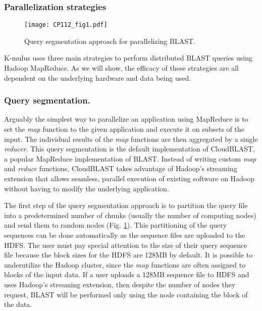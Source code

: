 \subsubsection{Parallelization strategies}

\begin{figure}[!htb]%
\begin{center}
\texttt{[image: CP112\_fig1.pdf]}
\end{center}
\renewcommand{\baselinestretch}{1}
\small\normalsize
\begin{quote}
\caption[Query segmentation approach for parallelizing BLAST]{Query segmentation approach for parallelizing BLAST.}
\label{fig:strategies}
\end{quote}
\end{figure}
\renewcommand{\baselinestretch}{2}
\small\normalsize


K-mulus uses three main strategies to perform distributed BLAST queries using Hadoop MapReduce.
As we will show, the efficacy of these strategies are all dependent on the underlying hardware and data being used.
\subsubsection{Query segmentation.}
Arguably the simplest way to parallelize an application using MapReduce is to set the \emph{map} function to the given application and execute it on subsets of the input.
The individual results of the \emph{map} functions are then aggregated by a single \emph{reducer}.
This query segmentation is the default implementation of CloudBLAST\cite{matsunaga2008cloudblast}, a popular MapReduce implementation of BLAST.
Instead of writing custom \emph{map} and \emph{reduce} functions, CloudBLAST takes advantage of Hadoop's streaming extension that allows seamless, parallel execution of existing software on Hadoop without having to modify the underlying application.

The first step of the query segmentation approach is to partition the query file into a predetermined number of chunks (usually the number of computing nodes) and send them to random nodes (Fig. \ref{fig:strategies}).
This partitioning of the query sequences can be done automatically as the sequence files are uploaded to the HDFS.
The user must pay special attention to the size of their query sequence file because the block sizes for the HDFS are 128MB by default.
It is possible to underutilize the Hadoop cluster, since the \emph{map} functions are often assigned to blocks of the input data.
If a user uploads a 128MB sequence file to HDFS and uses Hadoop's streaming extension, then despite the number of nodes they request, BLAST will be performed only using the node containing the block of the data.

